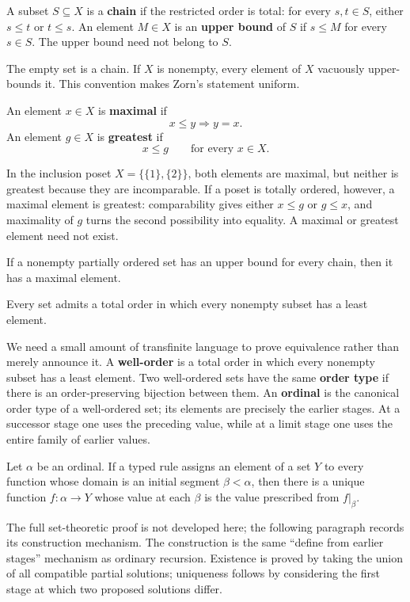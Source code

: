 \begin{definition}
A subset $S\subseteq X$ is a \textbf{chain} if the restricted order is
total: for every $s,t\in S$, either $s\leq t$ or $t\leq s$. An element
$M\in X$ is an \textbf{upper bound} of $S$ if $s\leq M$ for every
$s\in S$. The upper bound need not belong to $S$.
\end{definition}
The empty set is a chain. If $X$ is nonempty, every element of $X$
vacuously upper-bounds it. This convention makes Zorn's statement uniform.

\begin{definition}
An element $x\in X$ is \textbf{maximal} if
\[
x\leq y\Longrightarrow y=x.
\]
An element $g\in X$ is \textbf{greatest} if
\[
x\leq g\qquad\text{for every }x\in X.
\]
\end{definition}
In the inclusion poset $X=\{\{1\},\{2\}\}$, both elements are maximal,
but neither is greatest because they are incomparable. If a poset is totally
ordered, however, a maximal element is greatest: comparability gives either
$x\leq g$ or $g\leq x$, and maximality of $g$ turns the second possibility
into equality. A maximal or greatest element need not exist.

\begin{theorem}\label{thm:zorn}
If a nonempty partially ordered set has an upper bound for every chain, then
it has a maximal element.
\end{theorem}
\begin{theorem}
\label{thm:well-ordering-theorem}
Every set admits a total order in which every nonempty subset has a least
element.
\end{theorem}

We need a small amount of transfinite language to prove equivalence rather
than merely announce it. A \textbf{well-order} is a total order in which
every nonempty subset has a least element. Two well-ordered sets have the
same \textbf{order type} if there is an order-preserving bijection between
them. An \textbf{ordinal} is the canonical order type of a well-ordered set;
its elements are precisely the earlier stages. At a successor stage one
uses the preceding value, while at a limit stage one uses the entire family
of earlier values.

\begin{theorem}
\label{thm:transfinite-recursion}
Let $\alpha$ be an ordinal. If a typed rule assigns an element of a set $Y$
to every function whose domain is an initial segment $\beta<\alpha$, then
there is a unique function $f:\alpha\to Y$ whose value at each $\beta$ is
the value prescribed from $f|_\beta$.
\end{theorem}
The full set-theoretic proof is not developed here; the following paragraph
records its construction mechanism.
The construction is the same ``define from earlier stages'' mechanism as
ordinary recursion. Existence is proved by taking the union of all compatible
partial solutions; uniqueness follows by considering the first stage at which
two proposed solutions differ.


